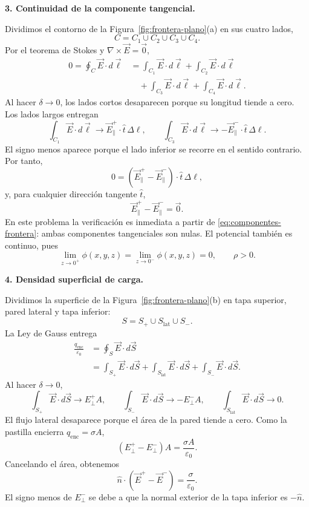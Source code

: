 \documentclass[11pt]{article}
\begin{document}
\textbf{3. Continuidad de la componente tangencial.}\par
Dividimos el contorno de la Figura~\ref{fig:frontera-plano}(a) en sus cuatro
lados,
\[
C=C_1\cup C_2\cup C_3\cup C_4.
\]
Por el teorema de Stokes y $\nabla\times\vec E=\vec0$,
\begin{align*}
0=\oint_C\vec E\cdot d\vec\ell
&=\int_{C_1}\vec E\cdot d\vec\ell
+\int_{C_2}\vec E\cdot d\vec\ell\\
&\quad+\int_{C_3}\vec E\cdot d\vec\ell
+\int_{C_4}\vec E\cdot d\vec\ell.
\end{align*}
Al hacer $\delta\to0$, los lados cortos desaparecen porque su longitud tiende a
cero. Los lados largos entregan
\[
\int_{C_1}\vec E\cdot d\vec\ell
\longrightarrow \vec E_\parallel^+\cdot\hat t\,\Delta\ell,
\qquad
\int_{C_3}\vec E\cdot d\vec\ell
\longrightarrow-\vec E_\parallel^-\cdot\hat t\,\Delta\ell.
\]
El signo menos aparece porque el lado inferior se recorre en el sentido
contrario. Por tanto,
\[
0=\left(\vec E_\parallel^+-\vec E_\parallel^-\right)
\cdot\hat t\,\Delta\ell,
\]
y, para cualquier dirección tangente $\hat t$,
\begin{equation}
\vec E^+_\parallel-\vec E^-_\parallel=\vec 0.
\label{eq:continuidad-tangencial}
\end{equation}
En este problema la verificación es inmediata a partir de
\eqref{eq:componentes-frontera}: ambas componentes tangenciales son nulas. El
potencial también es continuo, pues
\[
\lim_{z\to0^+}\phi(x,y,z)
=\lim_{z\to0^-}\phi(x,y,z)=0,
\qquad \rho>0.
\]

\textbf{4. Densidad superficial de carga.}\par
Dividimos la superficie de la Figura~\ref{fig:frontera-plano}(b) en tapa
superior, pared lateral y tapa inferior:
\[
S=S_+\cup S_{\mathrm{lat}}\cup S_-.
\]
La Ley de Gauss entrega
\begin{align*}
\frac{q_{\mathrm{enc}}}{\varepsilon_0}
&=\oint_S\vec E\cdot d\vec S\\
&=\int_{S_+}\vec E\cdot d\vec S
+\int_{S_{\mathrm{lat}}}\vec E\cdot d\vec S
+\int_{S_-}\vec E\cdot d\vec S.
\end{align*}
Al hacer $\delta\to0$,
\[
\int_{S_+}\vec E\cdot d\vec S\longrightarrow E_\perp^+A,
\qquad
\int_{S_-}\vec E\cdot d\vec S\longrightarrow-E_\perp^-A,
\qquad
\int_{S_{\mathrm{lat}}}\vec E\cdot d\vec S\longrightarrow0.
\]
El flujo lateral desaparece porque el área de la pared tiende a cero. Como la
pastilla encierra $q_{\mathrm{enc}}=\sigma A$,
\[
\left(E_\perp^+-E_\perp^-\right)A
=\frac{\sigma A}{\varepsilon_0}.
\]
Cancelando el área, obtenemos
\begin{equation}
\hat n\cdot\left(\vec E^+-\vec E^-\right)
=\frac{\sigma}{\varepsilon_0}.
\label{eq:salto-normal}
\end{equation}
El signo menos de $E_\perp^-$ se debe a que la normal exterior de la tapa
inferior es $-\hat n$.
\end{document}
